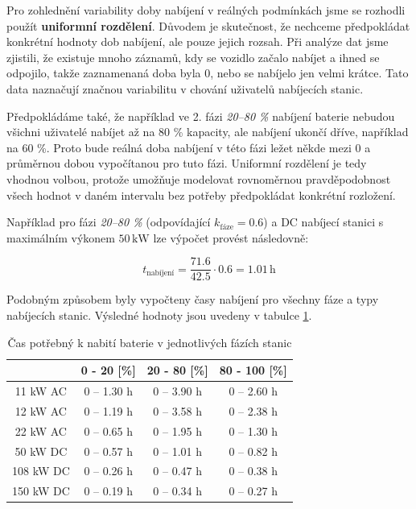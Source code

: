 \documentclass[a4paper,11pt]{article}
\begin{document}
Pro zohlednění variability doby nabíjení v reálných podmínkách jsme se rozhodli použít \textbf{uniformní rozdělení}.
Důvodem je skutečnost, že nechceme předpokládat konkrétní hodnoty dob nabíjení, ale pouze jejich rozsah.
Při analýze dat jsme zjistili, že existuje mnoho záznamů, kdy se vozidlo začalo nabíjet a ihned se odpojilo, takže
zaznamenaná doba byla 0, nebo se nabíjelo jen velmi krátce. Tato data naznačují značnou variabilitu v chování
uživatelů nabíjecích stanic.

Předpokládáme také, že například ve 2. fázi \textit{20–80 \%} nabíjení baterie nebudou všichni uživatelé nabíjet až
na 80 \% kapacity, ale nabíjení ukončí dříve, například na 60 \%. Proto bude reálná doba nabíjení v této fázi ležet
někde mezi 0 a průměrnou dobou vypočítanou pro tuto fázi. Uniformní rozdělení je tedy vhodnou volbou, protože
umožňuje modelovat rovnoměrnou pravděpodobnost všech hodnot v daném intervalu bez potřeby předpokládat konkrétní
rozložení.

Například pro fázi \textit{20–80 \%} (odpovídající \(k_{\text{fáze}} = 0.6\)) a DC nabíjecí stanici s maximálním výkonem \(50 \, \mathrm{kW}\) lze výpočet provést následovně:

\[
t_{\text{nabíjení}} = \frac{71.6}{42.5} \cdot 0.6 = 1.01 \, \mathrm{h}
\]

Podobným způsobem byly vypočteny časy nabíjení pro všechny fáze a typy nabíjecích stanic. Výsledné hodnoty jsou uvedeny v tabulce \ref{table:charging-time-consumption}.


\begin{table}[H]
    \centering 
    \vspace{0.5cm} %
    \begin{tabular}{|c|c|c|c|}
        \hline
        \textbf{} & \textbf{0 - 20 [\%]} & \textbf{20 - 80 [\%]} & \textbf{80 - 100 [\%]}\\
        \hline
        11 kW AC  &  0 -- 1.30 h  & 0 -- 3.90 h & 0 -- 2.60 h  \\
        \hline
        12 kW AC  &  0 -- 1.19 h  & 0 -- 3.58 h & 0 -- 2.38 h  \\
        \hline
        22 kW AC  &  0 -- 0.65 h  & 0 -- 1.95 h & 0 -- 1.30 h  \\
        \hline
        50 kW DC  &  0 -- 0.57 h & 0 -- 1.01 h & 0 -- 0.82 h  \\
        \hline
        108 kW DC &  0 -- 0.26 h  & 0 -- 0.47 h & 0 -- 0.38 h  \\
        \hline
        150 kW DC &  0 -- 0.19 h  & 0 -- 0.34 h & 0 -- 0.27 h  \\
        \hline
    \end{tabular}
    \caption{Čas potřebný k nabití baterie v jednotlivých fázích stanic}
    \label{table:charging-time-consumption}
    \vspace{0.5cm} %
\end{table}
\end{document}
